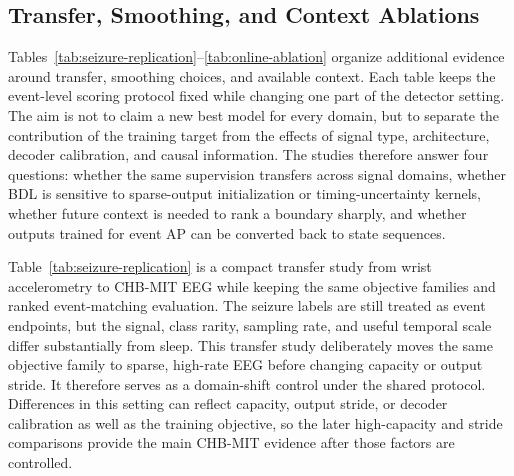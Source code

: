 \begin{center}
\centering
\label{tab:sleep-target-comparison}
\resizebox{0.86\textwidth}{!}{%

}
\end{center}

\begin{center}
\centering
\label{tab:sleep-architecture-main}

\end{center}


\clearpage
\subsection{Transfer, Smoothing, and Context Ablations}

Tables~\ref{tab:seizure-replication}--\ref{tab:online-ablation} organize additional evidence around transfer, smoothing choices, and available context.
Each table keeps the event-level scoring protocol fixed while changing one part of the detector setting.
The aim is not to claim a new best model for every domain, but to separate the contribution of the training target from the effects of signal type, architecture, decoder calibration, and causal information.
The studies therefore answer four questions: whether the same supervision transfers across signal domains, whether BDL is sensitive to sparse-output initialization or timing-uncertainty kernels, whether future context is needed to rank a boundary sharply, and whether outputs trained for event AP can be converted back to state sequences.

Table~\ref{tab:seizure-replication} is a compact transfer study from wrist accelerometry to CHB-MIT EEG while keeping the same objective families and ranked event-matching evaluation.
The seizure labels are still treated as event endpoints, but the signal, class rarity, sampling rate, and useful temporal scale differ substantially from sleep.
This transfer study deliberately moves the same objective family to sparse, high-rate EEG before changing capacity or output stride.
It therefore serves as a domain-shift control under the shared protocol.
Differences in this setting can reflect capacity, output stride, or decoder calibration as well as the training objective, so the later high-capacity and stride comparisons provide the main CHB-MIT evidence after those factors are controlled.

